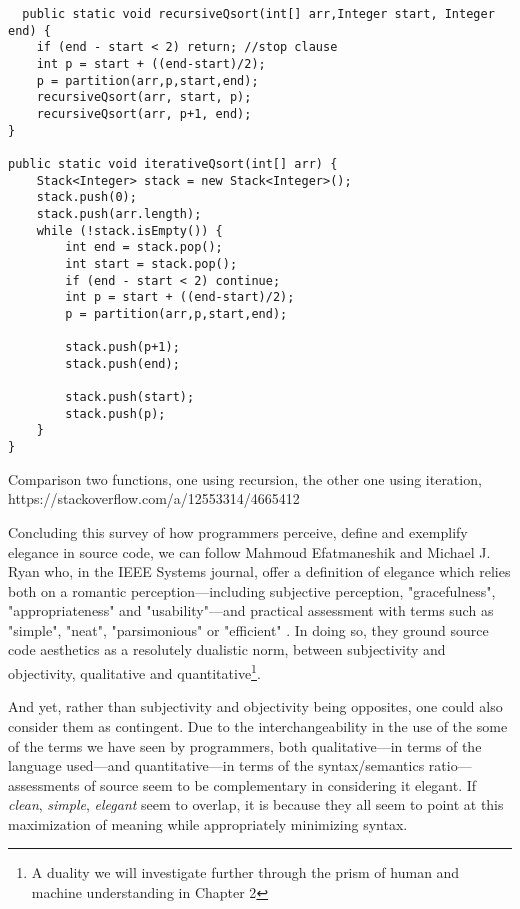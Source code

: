 \begin{listing}
  \begin{verbatim}
  public static void recursiveQsort(int[] arr,Integer start, Integer end) { 
    if (end - start < 2) return; //stop clause
    int p = start + ((end-start)/2);
    p = partition(arr,p,start,end);
    recursiveQsort(arr, start, p);
    recursiveQsort(arr, p+1, end);
}

public static void iterativeQsort(int[] arr) { 
    Stack<Integer> stack = new Stack<Integer>();
    stack.push(0);
    stack.push(arr.length);
    while (!stack.isEmpty()) {
        int end = stack.pop();
        int start = stack.pop();
        if (end - start < 2) continue;
        int p = start + ((end-start)/2);
        p = partition(arr,p,start,end);

        stack.push(p+1);
        stack.push(end);

        stack.push(start);
        stack.push(p);
    }
}
\end{verbatim}
  \caption{Comparison two functions, one using recursion, the other one using iteration, https://stackoverflow.com/a/12553314/4665412}
  \label{code:recursion_iteration_csharp}
\end{listing}

Concluding this survey of how programmers perceive, define and exemplify elegance in source code, we can follow Mahmoud Efatmaneshik and Michael J. Ryan who, in the IEEE Systems journal, offer a definition of elegance which relies both on a romantic perception—including subjective perception, "gracefulness", "appropriateness" and "usability"—and practical assessment with terms such as "simple", "neat", "parsimonious" or "efficient" \citep{efatmaneshnik_definitions_2019}. In doing so, they ground source code aesthetics as a resolutely dualistic norm, between subjectivity and objectivity, qualitative and quantitative\footnote{A duality we will investigate further through the prism of human and machine understanding in Chapter 2}.

And yet, rather than subjectivity and objectivity being opposites, one could also consider them as contingent. Due to the interchangeability in the use of the some of the terms we have seen by programmers, both qualitative—in terms of the language used—and quantitative—in terms of the syntax/semantics ratio—assessments of source seem to be complementary in considering it elegant. If \emph{clean}, \emph{simple}, \emph{elegant} seem to overlap, it is because they all seem to point at this maximization of meaning while appropriately minimizing syntax.

